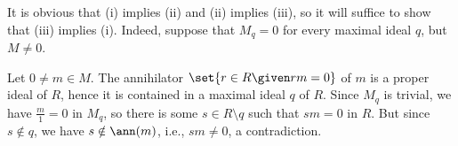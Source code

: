 It is obvious that (i) implies (ii) and (ii) implies (iii), so it will suffice
to show that (iii) implies (i). Indeed, suppose that $M_q = 0$ for every maximal
ideal $q$, but $M \neq 0$.

Let $0\neq m \in M$. The annihilator $\set{r \in R\given rm = 0}$ of $m$ is
a proper ideal of $R$, hence it is contained in a maximal ideal $q$ of $R$.
Since $M_q$ is trivial, we have $\frac{m}{1} = 0$ in $M_q$, so there is some
$s \in R\setminus q$ such that $sm = 0$ in $R$. But since $s \notin q$,
we have $s\notin \ann(m)$, i.e., $sm \neq 0$, a contradiction.
